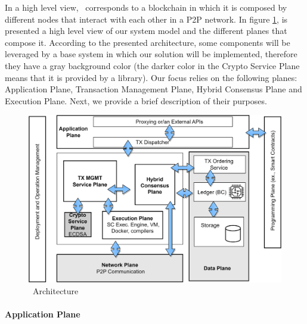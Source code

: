 In a high level view, \mysystem~corresponds to a blockchain in which it is composed by different nodes that interact with each other in a \gls{P2P} network. %
In figure \ref{fig:hyflexchain_architecture}, is presented a high level view of our system model and the different planes that compose it. According to the presented architecture, some components will be leveraged by a base system in which our solution will be implemented, therefore they have a gray background color (the darker color in the Crypto Service Plane means that it is provided by a library). Our focus relies on the following planes: Application Plane, Transaction Management Plane, Hybrid Consensus Plane and Execution Plane. Next, we provide a brief description of their purposes.

\begin{figure}[h]
    \centering
    \includegraphics[scale=0.55]{Chapters/Figures/drawio/hyflexchain/hyflexchain_architecture.png}
    \caption{\mysystem~Architecture}
    \label{fig:hyflexchain_architecture}
\end{figure}

\paragraph{Application Plane}

